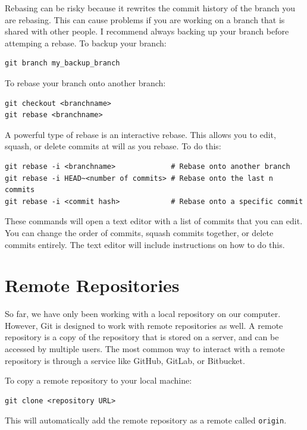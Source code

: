\documentclass[fleqn]{article}
\begin{document}
Rebasing can be risky because it rewrites the commit history of the branch you
are rebasing. This can cause problems if you are working on a branch that is
shared with other people. I recommend always backing up your branch before 
attemping a rebase. To backup your branch:

\begin{lstlisting}
git branch my_backup_branch
\end{lstlisting}

To rebase your branch onto another branch:

\begin{lstlisting}
git checkout <branchname>
git rebase <branchname>
\end{lstlisting}

A powerful type of rebase is an interactive rebase. This allows you to edit,
squash, or delete commits at will as you rebase. To do this:

\begin{lstlisting}
git rebase -i <branchname>             # Rebase onto another branch
git rebase -i HEAD~<number of commits> # Rebase onto the last n commits
git rebase -i <commit hash>            # Rebase onto a specific commit
\end{lstlisting}

These commands will open a text editor with a list of commits that you can
edit. You can change the order of commits, squash commits together, or delete
commits entirely. The text editor will include instructions on how to do this.

\pagebreak

\section*{Remote Repositories}

So far, we have only been working with a local repository on our computer.
However, Git is designed to work with remote repositories as well. A remote
repository is a copy of the repository that is stored on a server, and can be
accessed by multiple users. The most common way to interact with a remote
repository is through a service like GitHub, GitLab, or Bitbucket.

To copy a remote repository to your local machine:

\begin{lstlisting}
git clone <repository URL>
\end{lstlisting}

This will automatically add the remote repository as a remote called
\texttt{origin}.
\end{document}
